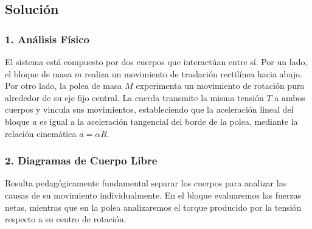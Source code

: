 \documentclass[12pt, a4paper]{article}
\begin{document}
\begin{center}
\end{center}

\subsection*{Solución}

\subsubsection*{1. Análisis Físico}
El sistema está compuesto por dos cuerpos que interactúan entre sí. Por un lado, el bloque de masa $m$ realiza un movimiento de traslación rectilínea hacia abajo. Por otro lado, la polea de masa $M$ experimenta un movimiento de rotación pura alrededor de su eje fijo central. La cuerda transmite la misma tensión $T$ a ambos cuerpos y vincula sus movimientos, estableciendo que la aceleración lineal del bloque $a$ es igual a la aceleración tangencial del borde de la polea, mediante la relación cinemática $a = \alpha R$.

\subsubsection*{2. Diagramas de Cuerpo Libre}
Resulta pedagógicamente fundamental separar los cuerpos para analizar las causas de su movimiento individualmente. En el bloque evaluaremos las fuerzas netas, mientras que en la polea analizaremos el torque producido por la tensión respecto a su centro de rotación.
\end{document}
